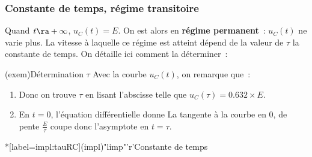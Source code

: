 \documentclass[../../main/main.tex]{subfiles}
\begin{document}
\subsubsection{Constante de temps, régime transitoire}
Quand $t \ra +\infty$, $u_C(t) = E$. On est alors en \textbf{régime permanent}~:
$u_C(t)$ ne varie plus. La vitesse à laquelle ce régime est atteint dépend de la
valeur de $\tau$ la constante de temps. On détaille ici comment la déterminer~:
\begin{tcbraster}[raster columns=2, raster equal height=rows]
	\begin{tcb}[label=impl:déterm](exem){Détermination $\tau$}
		Avec la courbe $u_C(t)$, on remarque que~:
		\begin{enumerate}
			\item {}
			      \smallbreak
			      Donc on trouve $\tau$ en lisant l'abscisse telle que $u_C(\tau) =
				      \num{0.632}\times E$.
			\item En $t=0$, l'équation différentielle donne
			      \psw{
				      \[
					      \dv{u_C}{t}\/ (0) + \underbracket[1pt]{\frac{u_C(0)}{\tau}}_{=0}
					      = \frac{E}{\tau}
				      \]
			      }
			      La tangente à la courbe en 0, de pente $\frac{E}{\tau}$ coupe donc
			      l'asymptote en $t = \tau$.
		\end{enumerate}
	\end{tcb}
	\begin{tcb}*[label=impl:tauRC](impl)"limp"'r'{Constante de temps}
\end{tcb}
\end{tcbraster}
\end{document}
